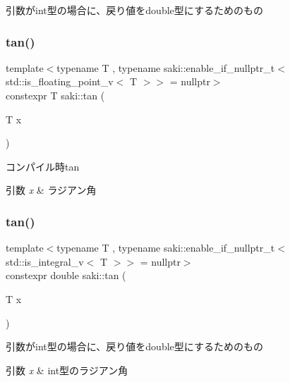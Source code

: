 引数がint型の場合に、戻り値をdouble型にするためのもの 

\mbox{\label{namespacesaki_a491321db8475898649b625dca5401726}} 
\subsubsection{\texorpdfstring{tan()}{tan()}\hspace{0.1cm}{\footnotesize\ttfamily [1/2]}}
{\footnotesize\ttfamily template$<$typename T , typename saki\+::enable\+\_\+if\+\_\+nullptr\+\_\+t$<$ std\+::is\+\_\+floating\+\_\+point\+\_\+v$<$ T $>$$>$  = nullptr$>$ \\
constexpr T saki\+::tan (\begin{DoxyParamCaption}\item[{T}]{x }\end{DoxyParamCaption})}



コンパイル時tan 


\begin{DoxyParams}{引数}
{\em x} & ラジアン角 \\
\hline
\end{DoxyParams}
\mbox{\label{namespacesaki_a52704083849bbdf4ab635cca985c00ae}} 
\subsubsection{\texorpdfstring{tan()}{tan()}\hspace{0.1cm}{\footnotesize\ttfamily [2/2]}}
{\footnotesize\ttfamily template$<$typename T , typename saki\+::enable\+\_\+if\+\_\+nullptr\+\_\+t$<$ std\+::is\+\_\+integral\+\_\+v$<$ T $>$$>$  = nullptr$>$ \\
constexpr double saki\+::tan (\begin{DoxyParamCaption}\item[{T}]{x }\end{DoxyParamCaption})}



引数がint型の場合に、戻り値をdouble型にするためのもの 


\begin{DoxyParams}{引数}
{\em x} & int型のラジアン角 \\
\hline
\end{DoxyParams}
\mbox{\label{namespacesaki_af2674216630169ce211f8076492ce14e}} 
